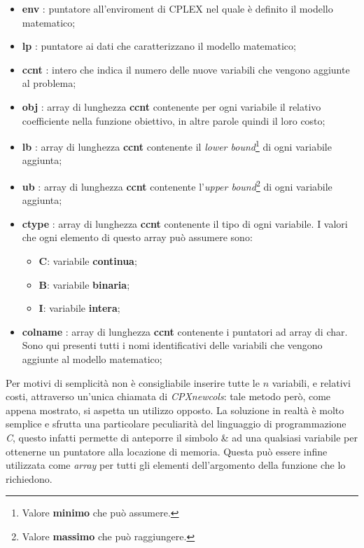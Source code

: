 \documentclass[11pt]{article}
\begin{document}
\begin{itemize}
\item \textbf{env} : puntatore all'enviroment di CPLEX nel quale è definito il modello matematico;
\item \textbf{lp} : puntatore ai dati che caratterizzano il modello matematico;
\item \textbf{ccnt} : intero che indica il numero delle nuove variabili che vengono aggiunte al problema;
\item \textbf{obj} : array di lunghezza \textbf{ccnt} contenente per ogni variabile il relativo coefficiente nella funzione obiettivo, in altre parole quindi il loro costo;
\item \textbf{lb} : array di lunghezza \textbf{ccnt} contenente il \textit{lower bound}\footnote{Valore \textbf{minimo} che può assumere.} di ogni variabile aggiunta;
\item \textbf{ub} : array di lunghezza \textbf{ccnt} contenente l'\textit{upper bound}\footnote{Valore \textbf{massimo} che può raggiungere.} di ogni variabile aggiunta;
\item \textbf{ctype} : array di lunghezza \textbf{ccnt} contenente il tipo di ogni variabile. I valori che ogni elemento di questo array può assumere sono:
\begin{itemize}
    \item \textbf{C}: variabile \textbf{continua};
    \item \textbf{B}: variabile \textbf{binaria};
    \item \textbf{I}: variabile \textbf{intera};
\end{itemize}
\item \textbf{colname} : array di lunghezza \textbf{ccnt} contenente i puntatori ad array di char. Sono qui presenti tutti i nomi identificativi delle variabili che vengono aggiunte al modello matematico;
\end{itemize}

Per motivi di semplicità non è consigliabile inserire tutte le $n$ variabili, e relativi costi, attraverso un'unica chiamata di \textit{CPXnewcols}: tale metodo però, come appena mostrato, si aspetta un utilizzo opposto. La soluzione in realtà è molto semplice e sfrutta una particolare peculiarità del linguaggio di programmazione \textit{C}, questo infatti permette di anteporre il simbolo \& ad una qualsiasi variabile per ottenerne un puntatore alla locazione di memoria. Questa può essere infine utilizzata come \textit{array} per tutti gli elementi dell'argomento della funzione che lo richiedono.
\end{document}
